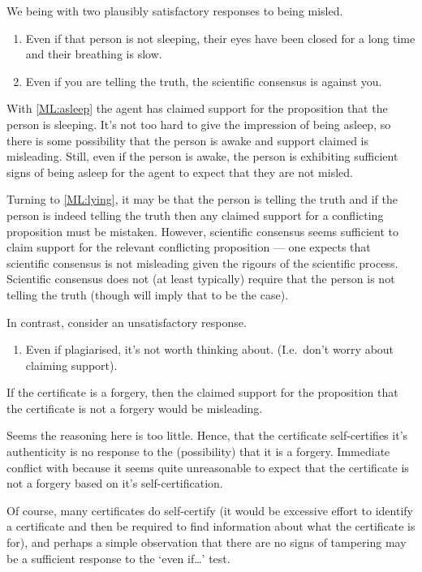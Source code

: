 \begin{note}
  We being with two plausibly satisfactory responses to being misled.

  \begin{enumerate}[label=(ML\arabic*), ref=(ML\arabic*), series=ML_counter]
  \item\label{ML:asleep} Even if that person is not sleeping, their eyes have been closed for a long time and their breathing is slow.
  \item\label{ML:lying} Even if you are telling the truth, the scientific consensus is against you.
  \end{enumerate}

  With \ref{ML:asleep} the agent has claimed support for the proposition that the person is sleeping.
  It's not too hard to give the impression of being asleep, so there is some possibility that the person is awake and support claimed is misleading.
  Still, even if the person is awake, the person is exhibiting sufficient signs of being asleep for the agent to expect that they are not misled.

  Turning to \ref{ML:lying}, it may be that the person is telling the truth and if the person is indeed telling the truth then any claimed support for a conflicting proposition must be mistaken.
  However, scientific consensus seems sufficient to claim support for the relevant conflicting proposition --- one expects that scientific consensus is not misleading given the rigours of the scientific process.
  Scientific consensus does not (at least typically) require that the person is not telling the truth (though will imply that to be the case).

  In contrast, consider an unsatisfactory response.

  \begin{enumerate}[label=(ML\arabic*), ref=(ML\arabic*), resume*=ML_counter]
  \item\label{ML:forgery} Even if plagiarised, it's not worth thinking about. (I.e.\ don't worry about claiming support).
  \end{enumerate}
  If the certificate is a forgery, then the claimed support for the proposition that the certificate is not a forgery would be misleading.

  Seems the reasoning here is too little.
  Hence, that the certificate self-certifies it's authenticity is no response to the (possibility) that it is a forgery.
  Immediate conflict with \eiS{} because it seems quite unreasonable to expect that the certificate is not a forgery based on it's self-certification.

  Of course, many certificates do self-certify (it would be excessive effort to identify a certificate and then be required to find information about what the certificate is for), and perhaps a simple observation that there are no signs of tampering may be a sufficient response to the `even if\dots' test.
\end{note}

